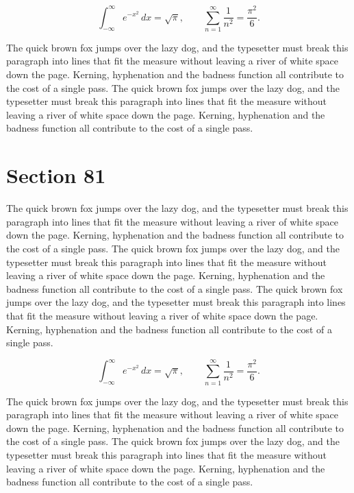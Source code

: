 \documentclass{article}
\begin{document}
\begin{equation}
\int_{-\infty}^{\infty} e^{-x^{2}}\,dx = \sqrt{\pi}, \qquad
\sum_{n=1}^{\infty} \frac{1}{n^{2}} = \frac{\pi^{2}}{6}.
\end{equation}

The quick brown fox jumps over the lazy dog, and the typesetter must break this paragraph into lines that fit the measure without leaving a river of white space down the page. Kerning, hyphenation and the badness function all contribute to the cost of a single pass. The quick brown fox jumps over the lazy dog, and the typesetter must break this paragraph into lines that fit the measure without leaving a river of white space down the page. Kerning, hyphenation and the badness function all contribute to the cost of a single pass. 
\section{Section 81}
The quick brown fox jumps over the lazy dog, and the typesetter must break this paragraph into lines that fit the measure without leaving a river of white space down the page. Kerning, hyphenation and the badness function all contribute to the cost of a single pass. The quick brown fox jumps over the lazy dog, and the typesetter must break this paragraph into lines that fit the measure without leaving a river of white space down the page. Kerning, hyphenation and the badness function all contribute to the cost of a single pass. The quick brown fox jumps over the lazy dog, and the typesetter must break this paragraph into lines that fit the measure without leaving a river of white space down the page. Kerning, hyphenation and the badness function all contribute to the cost of a single pass. 

\begin{equation}
\int_{-\infty}^{\infty} e^{-x^{2}}\,dx = \sqrt{\pi}, \qquad
\sum_{n=1}^{\infty} \frac{1}{n^{2}} = \frac{\pi^{2}}{6}.
\end{equation}

The quick brown fox jumps over the lazy dog, and the typesetter must break this paragraph into lines that fit the measure without leaving a river of white space down the page. Kerning, hyphenation and the badness function all contribute to the cost of a single pass. The quick brown fox jumps over the lazy dog, and the typesetter must break this paragraph into lines that fit the measure without leaving a river of white space down the page. Kerning, hyphenation and the badness function all contribute to the cost of a single pass. 
\end{document}
